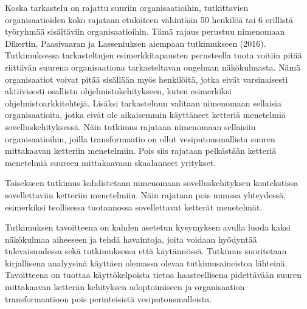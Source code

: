 Koska tarkastelu on rajattu suuriin organisaatioihin, tutkittavien
organisaatioiden koko rajataan etukäteen vähintään 50 henkilöä tai
6 erillistä työryhmää sisältäviin organisaatioihin. Tämä rajaus
perustuu nimenomaan Dikertin, Paasivaaran ja Lasseniuksen aiempaan
tutkimukseen (2016). Tutkimuksessa tarkasteltujen esimerkkitapausten
perusteella tuota voitiin pitää riittävän suurena organisaationa
tarkasteltavan ongelman näkökulmasta. Nämä organisaatiot voivat
pitää sisällään myös henkilöitä, jotka eivät varsinaisesti
aktiivisesti osallistu ohjelmistokehitykseen, kuten esimerkiksi
ohjelmistoarkkitehtejä. Lisäksi tarkasteluun valitaan nimenomaan
sellaisia organisaatioita, jotka eivät ole aikaisemmin käyttäneet
ketteriä menetelmiä sovelluskehityksessä. Näin tutkimus rajataan
nimenomaan sellaisiin organisaatioihin, joilla transformaatio on ollut
vesiputousmallista suuren mittakaavan ketteriin menetelmiin. Pois siis
rajataan pelkästään ketteriä menetelmiä suureen mittakaavaan
skaalanneet yritykset.

Toisekseen tutkimus kohdistetaan nimenomaan sovelluskehityksen
kontekstissa sovellettaviin ketteriin menetelmiin. Näin rajataan pois
muussa yhteydessä, esimerkiksi teollisessa tuotannossa sovellettavat
ketterät menetelmät.

Tutkimuksen tavoitteena on kahden asetetun kysymyksen avulla luoda
kaksi näkökulmaa aiheeseen ja tehdä havaintoja, joita voidaan
hyödyntää tulevaisuudessa sekä tutkimuksessa että käytännössä.
Tutkimus suoritetaan kirjallisena analyysinä käyttäen olemassa olevaa
tutkimusaineistoa lähteinä. Tavoitteena on tuottaa käyttökelpoista
tietoa haasteellisena pidettävään suuren mittakaavan ketterän
kehityksen adoptoimiseen ja organisaation transformaatioon pois
perinteisistä vesiputousmalleista.
